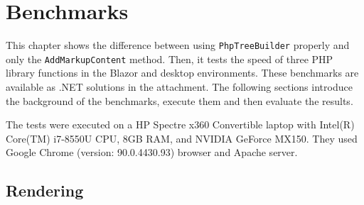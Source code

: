 \chapter{Benchmarks}

This chapter shows the difference between using \texttt{PhpTreeBuilder} properly and only the \texttt{AddMarkupContent} method.
Then, it tests the speed of three PHP library functions in the Blazor and desktop environments.
These benchmarks are available as .NET solutions in the attachment.
The following sections introduce the background of the benchmarks, execute them and then evaluate the results.
\par
The tests were executed on a HP Spectre x360 Convertible laptop with Intel(R) Core(TM) i7-8550U CPU, 8GB RAM, and NVIDIA GeForce MX150.
They used Google Chrome (version: 90.0.4430.93) browser and Apache server.

\section{Rendering}

